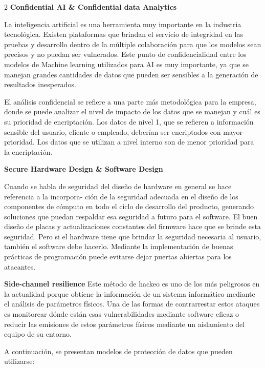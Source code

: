 \documentclass[12pt,spanish,Letterpaper,openany]{book}
\begin{document}
\begin {multicols}{2}
\textbf{Confidential AI \& Confidential data Analytics}

La inteligencia artificial es una herramienta muy importante en la industria tecnológica. Existen plataformas que brindan el servicio de integridad en las pruebas y desarrollo dentro de la múltiple colaboración para que los modelos sean precisos y no puedan ser vulnerados. Este punto de confidencialidad entre los modelos de Machine learning utilizados para AI es muy importante, ya que se manejan grandes cantidades de datos que pueden ser sensibles a la generación de resultados inesperados.

El análisis confidencial se refiere a una parte más metodológica para la empresa, donde se puede analizar el nivel de impacto de los datos que se manejan y cuál es su prioridad de encriptación. Los datos de nivel 1, que se refieren a información sensible del usuario, cliente o empleado, deberían ser encriptados con mayor prioridad. Los datos que se utilizan a nivel interno son de menor prioridad para la encriptación.

\textbf{Secure Hardware Design \& Software Design}

Cuando se habla de seguridad del diseño de hardware en general se hace referencia a la incorpora-
ción de la seguridad adecuada en el diseño de los componentes de cómputo en todo el ciclo de desarrollo del producto, generando soluciones que puedan respaldar esa seguridad a futuro para el software. El buen diseño de placas y actualizaciones constantes del firmware hace que se brinde esta seguridad. Pero si el hardware tiene que brindar la seguridad necesaria al usuario, también el software debe hacerlo. Mediante la implementación de buenas prácticas de programación puede evitarse dejar puertas abiertas para los atacantes.

\textbf{Side-channel resilience}
Este método de hackeo es uno de los más peligrosos en la actualidad porque obtiene la información de un sistema informático mediante el análisis de parámetros físicos. Una de las formas de contrarrestar estos ataques es monitorear dónde están esas vulnerabilidades mediante software eficaz o reducir las emisiones de estos parámetros físicos mediante un aislamiento del equipo de su entorno.

A continuación, se presentan modelos de protección de datos que pueden utilizarse:

\begin {flushleft}
\noindent\begin{minipage}[c]{\columnwidth}


\end{minipage}
\end{flushleft}
\end{multicols}
\end{document}

